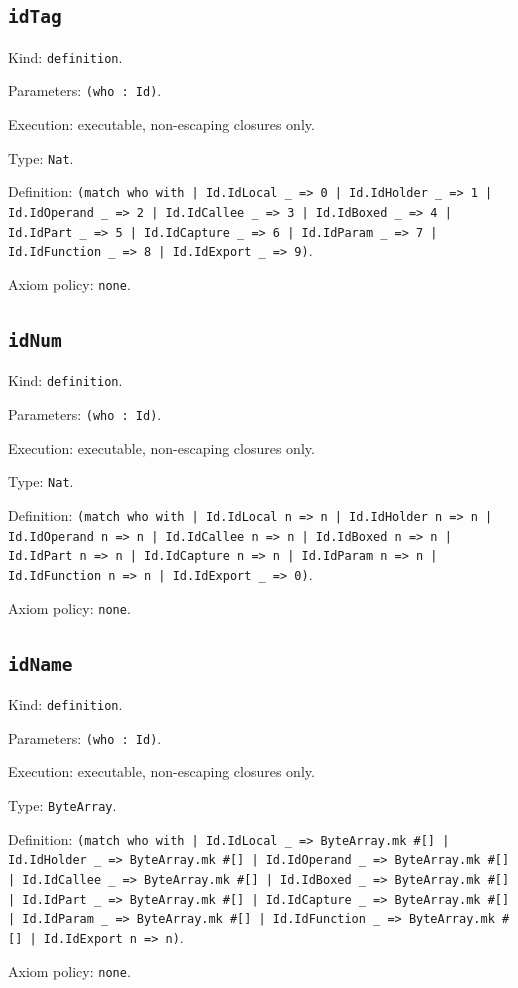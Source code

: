\documentclass[11pt]{article}
\begin{document}
\subsection*{\texttt{idTag}}
\noindent Kind: \texttt{definition}.\par
\noindent Parameters: \texttt{(who : Id)}.\par
\noindent Execution: executable, non-escaping closures only.\par
\noindent Type: \texttt{Nat}.\par
\noindent Definition: \texttt{(match who with | Id.IdLocal \_ => 0 | Id.IdHolder \_ => 1 | Id.IdOperand \_ => 2 | Id.IdCallee \_ => 3 | Id.IdBoxed \_ => 4 | Id.IdPart \_ => 5 | Id.IdCapture \_ => 6 | Id.IdParam \_ => 7 | Id.IdFunction \_ => 8 | Id.IdExport \_ => 9)}.\par
\noindent Axiom policy: \texttt{none}.\par
\subsection*{\texttt{idNum}}
\noindent Kind: \texttt{definition}.\par
\noindent Parameters: \texttt{(who : Id)}.\par
\noindent Execution: executable, non-escaping closures only.\par
\noindent Type: \texttt{Nat}.\par
\noindent Definition: \texttt{(match who with | Id.IdLocal n => n | Id.IdHolder n => n | Id.IdOperand n => n | Id.IdCallee n => n | Id.IdBoxed n => n | Id.IdPart n => n | Id.IdCapture n => n | Id.IdParam n => n | Id.IdFunction n => n | Id.IdExport \_ => 0)}.\par
\noindent Axiom policy: \texttt{none}.\par
\subsection*{\texttt{idName}}
\noindent Kind: \texttt{definition}.\par
\noindent Parameters: \texttt{(who : Id)}.\par
\noindent Execution: executable, non-escaping closures only.\par
\noindent Type: \texttt{ByteArray}.\par
\noindent Definition: \texttt{(match who with | Id.IdLocal \_ => ByteArray.mk \#[] | Id.IdHolder \_ => ByteArray.mk \#[] | Id.IdOperand \_ => ByteArray.mk \#[] | Id.IdCallee \_ => ByteArray.mk \#[] | Id.IdBoxed \_ => ByteArray.mk \#[] | Id.IdPart \_ => ByteArray.mk \#[] | Id.IdCapture \_ => ByteArray.mk \#[] | Id.IdParam \_ => ByteArray.mk \#[] | Id.IdFunction \_ => ByteArray.mk \#[] | Id.IdExport n => n)}.\par
\noindent Axiom policy: \texttt{none}.\par
\end{document}
